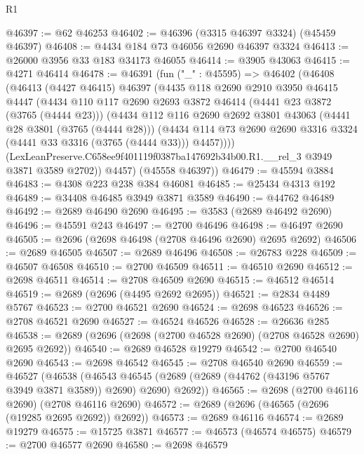 \begin{lexlean}{R1}
\begin{coremodule}
@46397 := @62 @46253
@46402 := @46396 (@3315 @46397 @3324) (@45459 @46397)
@46408 := @4434 @184 @73 @46056 @2690 @46397 @3324
@46413 := @26000 @3956 @33 @183 @34173 @46055
@46414 := @3905 @43063
@46415 := @4271 @46414
@46478 := @46391
    (fun ("_" : @45595) =>
    @46402
      (@46408
        (@46413
          (@4427 @46415)
          @46397
          (@4435
            @118
            @2690
            @2910
            @3950
            @46415
            @4447
            (@4434
              @110
              @117
              @2690
              @2693
              @3872
              @46414
              (@4441 @23 @3872 (@3765 (@4444 @23)))
              (@4434
                @112
                @116
                @2690
                @2692
                @3801
                @43063
                (@4441 @28 @3801 (@3765 (@4444 @28)))
                (@4434
                  @114
                  @73
                  @2690
                  @2690
                  @3316
                  @3324
                  (@4441 @33 @3316 (@3765 (@4444 @33)))
                  @4457))))
          (LexLeanPreserve.C658ee9f401119f0387ba147692b34b00.R1.__rel_3 @3949 @3871 @3589 @2702))
        @4457)
      (@45558 @46397))
@46479 := @45594 @3884
@46483 := @4308 @223 @238 @384 @46081
@46485 := @25434 @4313 @192
@46489 := @34408 @46485 @3949 @3871 @3589
@46490 := @44762 @46489
@46492 := @2689 @46490 @2690
@46495 := @3583 (@2689 @46492 @2690)
@46496 := @45591 @243
@46497 := @2700 @46496
@46498 := @46497 @2690
@46505 := @2696 (@2698 @46498 (@2708 @46496 @2690) @2695 @2692)
@46506 := @2689 @46505
@46507 := @2689 @46496
@46508 := @26783 @228
@46509 := @46507 @46508
@46510 := @2700 @46509
@46511 := @46510 @2690
@46512 := @2698 @46511
@46514 := @2708 @46509 @2690
@46515 := @46512 @46514
@46519 := @2689 (@2696 (@4495 @2692 @2695))
@46521 := @2834 @4489 @5767
@46523 := @2700 @46521 @2690
@46524 := @2698 @46523
@46526 := @2708 @46521 @2690
@46527 := @46524 @46526
@46528 := @26636 @285
@46538 := @2689 (@2696 (@2698 (@2700 @46528 @2690) (@2708 @46528 @2690) @2695 @2692))
@46540 := @2689 @46528 @19279
@46542 := @2700 @46540 @2690
@46543 := @2698 @46542
@46545 := @2708 @46540 @2690
@46559 := @46527
    (@46538
      (@46543 @46545 (@2689 (@2689 (@44762 (@43196 @5767 @3949 @3871 @3589)) @2690) @2690) @2692))
@46565 := @2698 (@2700 @46116 @2690) (@2708 @46116 @2690)
@46572 := @2689 (@2696 (@46565 (@2696 (@19285 @2695 @2692)) @2692))
@46573 := @2689 @46116
@46574 := @2689 @19279
@46575 := @15725 @3871
@46577 := @46573 (@46574 @46575)
@46579 := @2700 @46577 @2690
@46580 := @2698 @46579

\end{coremodule}
\end{lexlean}
